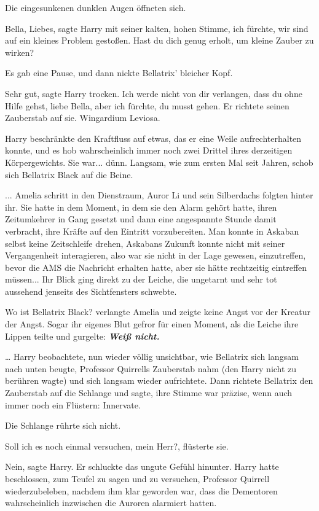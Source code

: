 Die eingesunkenen dunklen Augen öffneten sich.

\glqq{}Bella, Liebes\grqq{}, sagte Harry mit seiner kalten, hohen Stimme, \glqq{}
ich fürchte, wir sind auf ein kleines Problem gestoßen. Hast du dich genug
erholt, um kleine Zauber zu wirken?\grqq{}

Es gab eine Pause, und dann nickte Bellatrix' bleicher Kopf.

\glqq{}Sehr gut\grqq{}, sagte Harry trocken. \glqq{}Ich werde nicht von dir
verlangen, dass du ohne Hilfe gehst, liebe Bella, aber ich fürchte, du musst
gehen.\grqq{} Er richtete seinen Zauberstab auf sie. \glqq{}Wingardium Leviosa.\grqq{}

Harry beschränkte den Kraftfluss auf etwas, das er eine Weile aufrechterhalten
konnte, und es hob wahrscheinlich immer noch zwei Drittel ihres derzeitigen
Körpergewichts. Sie war... dünn. Langsam, wie zum ersten Mal seit Jahren, schob
sich Bellatrix Black auf die Beine.

... Amelia schritt in den Dienstraum, Auror Li und sein Silberdachs folgten
hinter ihr. Sie hatte in dem Moment, in dem sie den Alarm gehört hatte, ihren
Zeitumkehrer in Gang gesetzt und dann eine angespannte Stunde damit verbracht,
ihre Kräfte auf den Eintritt vorzubereiten. Man konnte in Askaban selbst keine
Zeitschleife drehen, Askabans Zukunft konnte nicht mit seiner Vergangenheit
interagieren, also war sie nicht in der Lage gewesen, einzutreffen, bevor die
AMS die Nachricht erhalten hatte, aber sie hätte rechtzeitig eintreffen
müssen... Ihr Blick ging direkt zu der Leiche, die ungetarnt und sehr tot
aussehend jenseits des Sichtfensters schwebte.

\glqq{}Wo ist Bellatrix Black?\grqq{} verlangte Amelia und zeigte keine Angst
vor der Kreatur der Angst. Sogar ihr eigenes Blut gefror für einen Moment, als
die Leiche ihre Lippen teilte und gurgelte: \textbf{\emph{\glqq{}Weiß
nicht.\grqq{}}}

… Harry beobachtete, nun wieder völlig unsichtbar, wie Bellatrix sich langsam
nach unten beugte, Professor Quirrells Zauberstab nahm (den Harry nicht zu
berühren wagte) und sich langsam wieder aufrichtete. Dann richtete Bellatrix den
Zauberstab auf die Schlange und sagte, ihre Stimme war präzise, wenn auch immer
noch ein Flüstern: \glqq{}Innervate.\grqq{}

Die Schlange rührte sich nicht.

\glqq{}Soll ich es noch einmal versuchen, mein Herr?\grqq{}, flüsterte sie.

\glqq{}Nein\grqq{}, sagte Harry. Er schluckte das ungute Gefühl hinunter. Harry
hatte beschlossen, zum Teufel zu sagen und zu versuchen, Professor Quirrell
wiederzubeleben, nachdem ihm klar geworden war, dass die Dementoren
wahrscheinlich inzwischen die Auroren alarmiert hatten.

